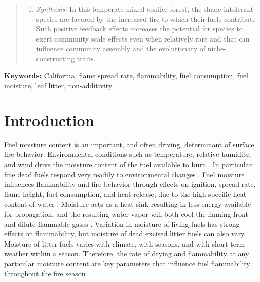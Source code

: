 \documentclass[letterpaper,12pt]{article}
\begin{document}
\begin{abstract}
\begin{enumerate}
    positive with fuel drying. Litter mixtures burn with fire behavior more
    similar to that of the most flammable constituent species and this effect
    increases as fuels dry.
      \item \emph{Synthesis:} In this temperate mixed conifer forest, the shade
    intolerant species are favored by the increased fire to which their fuels
    contribute Such positive feedback effects increases the potential for
    species to exert community scale effects even when relatively rare and that
    can influence community assembly and the evolutionary of niche-constructing
    traits.
  \end{enumerate}
\end{abstract}

\noindent \textbf{Keywords:} California, flame spread rate, flammability, fuel consumption, fuel moisture, leaf litter, non-additivity

\newpage

\section*{Introduction}

Fuel moisture content is an important, and often driving, determinant of
surface fire behavior. Environmental conditions such as temperature, relative
humidity, and wind drive the moisture content of the fuel available to burn
\citep{Kreye+Varner+etal-2018}. In particular, fine dead fuels respond very
readily to environmental changes \citep{Nelson-2001}. Fuel moisture influences
flammability and fire behavior through effects on ignition, spread rate, flame
height, fuel consumption, and heat release, due to the high specific heat
content of water \citep{Rothermel-1972, Nelson-2001}. Moisture acts as a
heat-sink resulting in less energy available for propagation, and the resulting
water vapor will both cool the flaming front and dilute flammable gases
\citep{Albini-1976, Shafizadeh-1977}. Variation in moisture of living fuels has
strong effects on flammability, but moisture of dead excised litter fuels can
also vary. Moisture of litter fuels varies with climate, with seasons, and with
short term weather within a season. Therefore, the rate of drying and
flammability at any particular moisture content are key parameters that
influence fuel flammability throughout the fire season \citep{Nelson-2001}.
\end{document}
